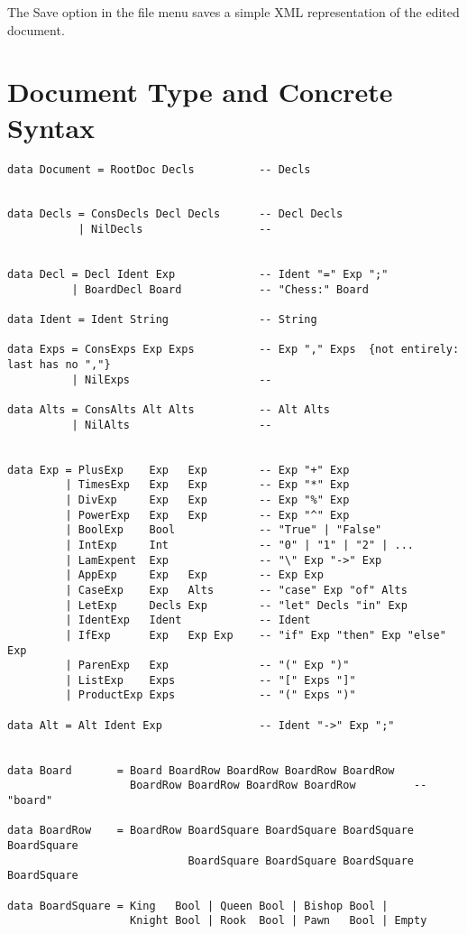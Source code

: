 \documentclass{article}
\begin{document}
\bigskip
\noindent The Save option in the file menu saves a simple XML representation of the edited document.

\section{Document Type and Concrete Syntax}
\begin{verbatim}
data Document = RootDoc Decls          -- Decls


data Decls = ConsDecls Decl Decls      -- Decl Decls
           | NilDecls                  --


data Decl = Decl Ident Exp             -- Ident "=" Exp ";"
          | BoardDecl Board            -- "Chess:" Board

data Ident = Ident String              -- String

data Exps = ConsExps Exp Exps          -- Exp "," Exps  {not entirely: last has no ","}
          | NilExps                    --

data Alts = ConsAlts Alt Alts          -- Alt Alts
          | NilAlts                    --


data Exp = PlusExp    Exp   Exp        -- Exp "+" Exp
         | TimesExp   Exp   Exp        -- Exp "*" Exp
         | DivExp     Exp   Exp        -- Exp "%" Exp
         | PowerExp   Exp   Exp        -- Exp "^" Exp
         | BoolExp    Bool             -- "True" | "False"
         | IntExp     Int              -- "0" | "1" | "2" | ...
         | LamExpent  Exp              -- "\" Exp "->" Exp
         | AppExp     Exp   Exp        -- Exp Exp
         | CaseExp    Exp   Alts       -- "case" Exp "of" Alts
         | LetExp     Decls Exp        -- "let" Decls "in" Exp
         | IdentExp   Ident            -- Ident
         | IfExp      Exp   Exp Exp    -- "if" Exp "then" Exp "else" Exp
         | ParenExp   Exp              -- "(" Exp ")"
         | ListExp    Exps             -- "[" Exps "]"
         | ProductExp Exps             -- "(" Exps ")"

data Alt = Alt Ident Exp               -- Ident "->" Exp ";"

                 
data Board       = Board BoardRow BoardRow BoardRow BoardRow 
                   BoardRow BoardRow BoardRow BoardRow         -- "board"  
                         
data BoardRow    = BoardRow BoardSquare BoardSquare BoardSquare BoardSquare
                            BoardSquare BoardSquare BoardSquare BoardSquare

data BoardSquare = King   Bool | Queen Bool | Bishop Bool | 
                   Knight Bool | Rook  Bool | Pawn   Bool | Empty
\end{verbatim}
\end{document}
